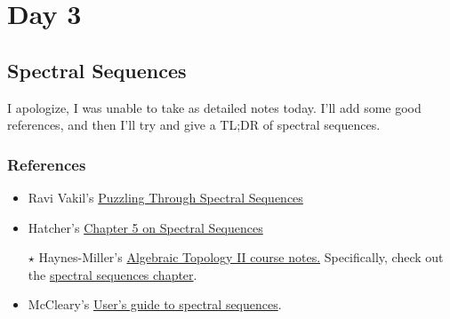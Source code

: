 \section{Day 3}

\subsection{Spectral Sequences}

I apologize, I was unable to take as detailed notes today. I'll add some good references, and then I'll try and give a TL;DR of spectral sequences. 

\subsubsection{References}
\begin{itemize}
    \item Ravi Vakil's \href{https://www.3blue1brown.com/content/blog/exact-sequence-picturebook/PuzzlingThroughExactSequences.pdf}{Puzzling Through Spectral Sequences}
    \item Hatcher's \href{https://pi.math.cornell.edu/~hatcher/AT/ATch5.pdf}{Chapter 5 on Spectral Sequences}
    \item[$\star$] Haynes-Miller's \href{https://ocw.mit.edu/courses/18-906-algebraic-topology-ii-spring-2020/pages/lecture-notes/}{Algebraic Topology II course notes.} Specifically, check out the \href{https://ocw.mit.edu/courses/18-906-algebraic-topology-ii-spring-2020/resources/mit18_906s20_ch4/}{spectral sequences chapter}.
    \item McCleary's \href{https://people.math.rochester.edu/faculty/doug/otherpapers/McCleary-UGSS.pdf}{User's guide to spectral sequences}.
\end{itemize}